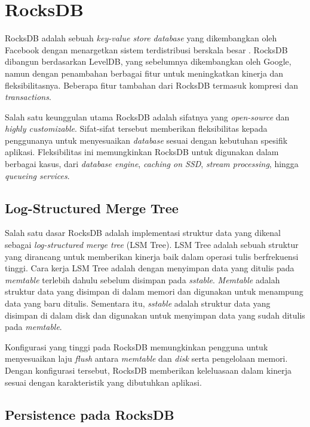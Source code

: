 \section{RocksDB}
\label{sec:rocksdb}

RocksDB adalah sebuah \textit{key-value store database} yang dikembangkan oleh Facebook dengan menargetkan sistem terdistribusi berskala besar \parencite{dong2021rocksdb}. RocksDB dibangun berdasarkan LevelDB, yang sebelumnya dikembangkan oleh Google, namun dengan penambahan berbagai fitur untuk meningkatkan kinerja dan fleksibilitasnya. Beberapa fitur tambahan dari RocksDB termasuk kompresi dan \textit{transactions}.

Salah satu keunggulan utama RocksDB adalah sifatnya yang \textit{open-source} dan \textit{highly customizable}. Sifat-sifat tersebut memberikan fleksibilitas kepada penggunanya untuk menyesuaikan \textit{database} sesuai dengan kebutuhan spesifik aplikasi. Fleksibilitas ini memungkinkan RocksDB untuk digunakan dalam berbagai kasus, dari \textit{database engine}, \textit{caching on SSD}, \textit{stream processing}, hingga \textit{queueing services}.

\subsection{Log-Structured Merge Tree}

Salah satu dasar RocksDB adalah implementasi struktur data yang dikenal sebagai \textit{log-structured merge tree} (LSM Tree). LSM Tree adalah sebuah struktur yang dirancang untuk memberikan kinerja baik dalam operasi tulis berfrekuensi tinggi. Cara kerja LSM Tree adalah dengan menyimpan data yang ditulis pada \textit{memtable} terlebih dahulu sebelum disimpan pada \textit{sstable}. \textit{Memtable} adalah struktur data yang disimpan di dalam memori dan digunakan untuk menampung data yang baru ditulis. Sementara itu, \textit{sstable} adalah struktur data yang disimpan di dalam disk dan digunakan untuk menyimpan data yang sudah ditulis pada \textit{memtable}.

Konfigurasi yang tinggi pada RocksDB memungkinkan pengguna untuk menyesuaikan laju \textit{flush} antara \textit{memtable} dan \textit{disk} serta pengelolaan memori. Dengan konfigurasi tersebut, RocksDB memberikan keleluasaan dalam kinerja sesuai dengan karakteristik yang dibutuhkan aplikasi.

\subsection{Persistence pada RocksDB}


